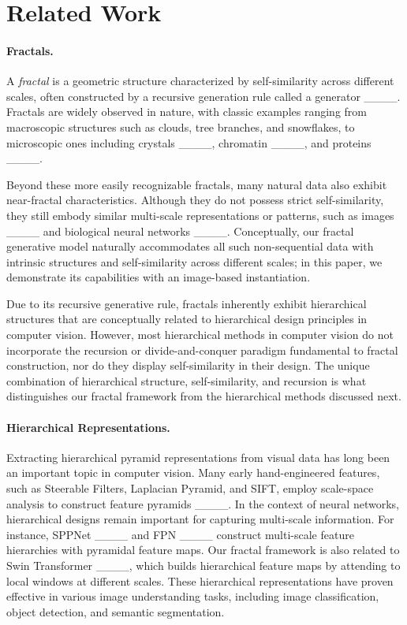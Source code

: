 \section{Related Work}
\paragraph{Fractals.} A \emph{fractal} is a geometric structure characterized by self-similarity across different scales, often constructed by a recursive generation rule called a generator ____. Fractals are widely observed in nature, with classic examples ranging from macroscopic structures such as clouds, tree branches, and snowflakes, to microscopic ones including crystals ____, chromatin ____, and proteins ____.

Beyond these more easily recognizable fractals, many natural data also exhibit near-fractal characteristics. Although they do not possess strict self-similarity, they still embody similar multi-scale representations or patterns, such as images ____ and biological neural networks ____.
Conceptually, our fractal generative model naturally accommodates all such non-sequential data with intrinsic structures and self-similarity across different scales; in this paper, we demonstrate its capabilities with an image-based instantiation.

Due to its recursive generative rule, fractals inherently exhibit hierarchical structures that are conceptually related to hierarchical design principles in computer vision. However, most hierarchical methods in computer vision do not incorporate the recursion or divide-and-conquer paradigm fundamental to fractal construction, nor do they display self-similarity in their design. The unique combination of hierarchical structure, self-similarity, and recursion is what distinguishes our fractal framework from the hierarchical methods discussed next.

\paragraph{Hierarchical Representations.} Extracting hierarchical pyramid representations from visual data has long been an important topic in computer vision. Many early hand-engineered features, such as Steerable Filters, Laplacian Pyramid, and SIFT, employ scale-space analysis to construct feature pyramids ____. 
In the context of neural networks, hierarchical designs remain important for capturing multi-scale information. For instance, SPPNet ____ and FPN ____ construct multi-scale feature hierarchies with pyramidal feature maps. Our fractal framework is also related to Swin Transformer ____, which builds hierarchical feature maps by attending to local windows at different scales. These hierarchical representations have proven effective in various image understanding tasks, including image classification, object detection, and semantic segmentation. 

